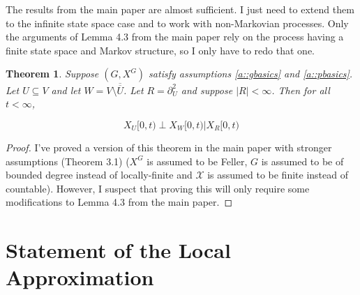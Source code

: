 \documentclass[12pt]{article}
\newcommand{\mc}{\mathcal}
\newcommand{\ov}{\overline}
\newcommand{\sta}{\mc{X}}							%
\newcommand{\dneigh}[1]{\partial^2_{#1}}			%
\newcommand{\Xf}{X}									%
\newcommand{\vind}[1]{_{#1}}						%
\newcommand{\tmi}[1]{#1}							%
\newcommand{\gind}[1]{^{#1}}						%
\newtheorem{thms}{Theorem}[section]
\begin{document}
The results from the main paper are almost sufficient. I just need to extend them to the infinite state space case and to work with non-Markovian processes. Only the arguments of Lemma 4.3 from the main paper rely on the process having a finite state space and Markov structure, so I only have to redo that one.

\begin{thms}
Suppose \((G,\Xf\gind{G})\) satisfy assumptions \ref{a::gbasics} and \ref{a::pbasics}. Let \(U \subseteq V\) and let \(W = V\setminus \ov{\ov{U}}\). Let \(R = \dneigh{U}\) and suppose \(|R| < \infty\). Then for all \(t < \infty\),

\begin{equation}
\Xf\vind{U}\tmi{[0,t)}\perp \Xf\vind{W}\tmi{[0,t)}|\Xf\vind{R}\tmi{[0,t)}
\label{CI::CIeqn}
\end{equation}

\label{CI::CI}
\end{thms}
\begin{proof}
I've proved a version of this theorem in the main paper with stronger assumptions (Theorem 3.1) (\(\Xf\gind{G}\) is assumed to be Feller, \(G\) is assumed to be of bounded degree instead of locally-finite and \(\sta\) is assumed to be finite instead of countable). However, I suspect that proving this will only require some modifications to Lemma 4.3 from the main paper.
\end{proof}
\section{Statement of the Local Approximation}
\label{Main}
\end{document}
